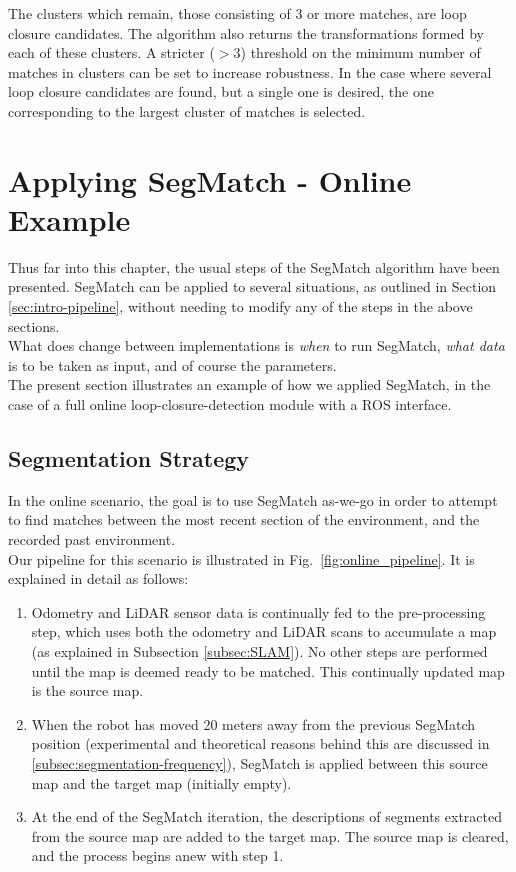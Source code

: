 The clusters which remain, those consisting of 3 or more matches, are loop closure candidates. The algorithm also returns the transformations formed by each of these clusters. A stricter ($>3$) threshold on the minimum number of matches in clusters can be set to increase robustness. In the case where several loop closure candidates are found, but a single one is desired, the one corresponding to the largest cluster of matches is selected.\\

\section{Applying SegMatch - Online Example}
\label{sec:online}

Thus far into this chapter, the usual steps of the SegMatch algorithm have been presented. SegMatch can be applied to several situations, as outlined in Section \ref{sec:intro-pipeline}, without needing to modify any of the steps in the above sections.\\

What does change between implementations is \textit{when} to run SegMatch, \textit{what data} is to be taken as input, and of course the parameters.\\

The present section illustrates an example of how we applied SegMatch, in the case of a full online loop-closure-detection module with a ROS interface.

\subsection{Segmentation Strategy}
\label{subsec:segmentation-strategy}

In the online scenario, the goal is to use SegMatch as-we-go in order to attempt to find matches between the most recent section of the environment, and the recorded past environment.\\

Our pipeline for this scenario is illustrated in Fig.~\ref{fig:online_pipeline}. It is explained in detail as follows:

\begin{enumerate}
  \item Odometry and LiDAR sensor data is continually fed to the pre-processing step, which uses both the odometry and LiDAR scans to accumulate a map (as explained in Subsection \ref{subsec:SLAM}). No other steps are performed until the map is deemed ready to be matched. This continually updated map is the source map.
  \item When the robot has moved 20 meters away from the previous SegMatch position (experimental and theoretical reasons behind this are discussed in \ref{subsec:segmentation-frequency}), SegMatch is applied between this source map and the target map (initially empty).
\item At the end of the SegMatch iteration, the descriptions of segments extracted from the source map are added to the target map. The source map is cleared, and the process begins anew with step 1.
\end{enumerate}


